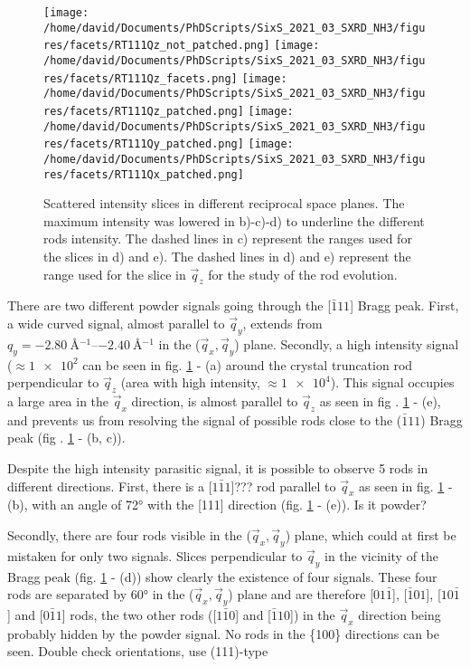 \begin{figure}[!htb]
    \centering   %
    \texttt{[image: /home/david/Documents/PhDScripts/SixS\_2021\_03\_SXRD\_NH3/figures/facets/RT111Qz\_not\_patched.png]}
    \texttt{[image: /home/david/Documents/PhDScripts/SixS\_2021\_03\_SXRD\_NH3/figures/facets/RT111Qz\_facets.png]}
    \texttt{[image: /home/david/Documents/PhDScripts/SixS\_2021\_03\_SXRD\_NH3/figures/facets/RT111Qz\_patched.png]}
    \texttt{[image: /home/david/Documents/PhDScripts/SixS\_2021\_03\_SXRD\_NH3/figures/facets/RT111Qy\_patched.png]}
    \texttt{[image: /home/david/Documents/PhDScripts/SixS\_2021\_03\_SXRD\_NH3/figures/facets/RT111Qx\_patched.png]}
    \caption{
        Scattered intensity slices in different reciprocal space planes.
        The maximum intensity was lowered in b)-c)-d) to underline the different rods intensity.
        The dashed lines in c) represent the ranges used for the slices in d) and e).
        The dashed lines in d) and e) represent the range used for the slice in $\vec{q}_z$ for the study of the rod evolution.
    }
    \label{fig:FacetMaps}
\end{figure}

There are two different powder signals going through the [$\bar{1}11$] Bragg peak.
First, a wide curved signal, almost parallel to $\vec{q}_y$, extends from $q_y = \qtyrange{-2.80}{-2.40}{\angstrom^{-1}}$ in the ($\vec{q}_x, \vec{q}_y$) plane.
Secondly, a  high intensity signal ($\approx \num{1e2}$ can be seen in fig. \ref{fig:FacetMaps} - (a) around the crystal truncation rod perpendicular to $\vec{q}_z$ (area with high intensity, $\approx \num{1e4}$).
This signal occupies a large area in the $\vec{q}_x$ direction, is almost parallel to $\vec{q}_z$ as seen in fig . \ref{fig:FacetMaps} - (e), and prevents us from resolving the signal of possible rods close to the ($\bar{1}11$)  Bragg peak (fig . \ref{fig:FacetMaps} - (b, c)).

Despite the high intensity parasitic signal, it is possible to observe 5 rods in different directions.
First, there is a [$1\bar{1}1$]??? rod parallel to $\vec{q}_x$ as seen in fig. \ref{fig:FacetMaps} - (b), with an angle of \ang{72} with the [111] direction (fig. \ref{fig:FacetMaps} - (e)).
\textcolor{Important}{Is it powder?}

Secondly, there are four rods visible in the ($\vec{q}_x, \vec{q}_y$) plane, which could at first be mistaken for only two signals.
Slices perpendicular to $\vec{q}_y$ in the vicinity of the Bragg peak (fig. \ref{fig:FacetMaps} - (d)) show clearly the existence of four signals.
These four rods are separated by \ang{60} in the ($\vec{q}_x, \vec{q}_y$) plane and are therefore [$01\bar{1}$], [$\bar{1}01$], [$10\bar{1}$] and [$0\bar{1}1$] rods, the two other rods ([$1\bar{1}0$] and [$\bar{1}10$]) in the $\vec{q}_x$ direction being probably hidden by the powder signal.
No rods in the \{100\} directions can be seen.
\textcolor{Important}{Double check orientations, use (111)-type}

